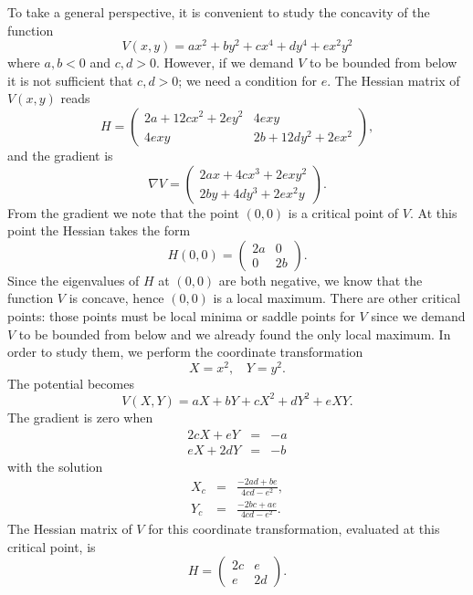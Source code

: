 To take a general perspective, it is convenient to study the concavity of the function
\begin{equation}
V(x,y) = ax^2 + by^2+cx^4+dy^4+ex^2y^2
\end{equation}
where $a,b<0$ and $c,d>0$. However, if we demand $V$ to be bounded from below it is not sufficient that $c,d>0$; we need a condition for $e$. The Hessian matrix of $V(x,y)$ reads
$$H=\begin{pmatrix}
2a+12cx^2+2ey^2 & 4exy \\
4exy & 2b+12dy^2+2ex^2 
\end{pmatrix},$$
and the gradient is
$$\nabla V = \begin{pmatrix}
2ax+4cx^3+2exy^2 \\
2by+4dy^3+2ex^2y
\end{pmatrix}.$$
From the gradient we note that the point $(0,0)$ is a critical point of $V$. At this point the Hessian takes the form
$$H(0,0)=\begin{pmatrix}
2a & 0 \\
0 & 2b
\end{pmatrix}.$$
Since the eigenvalues of $H$ at $(0,0)$ are both negative, we know that the function $V$ is concave, hence $(0,0)$ is a local maximum.
There are other critical points: those points must be local minima or saddle points for $V$ since we demand $V$ to be bounded from below and we already found the only local maximum. In order to study them, we perform the coordinate transformation
\begin{equation}
	X = x^2, \ \ \ \ Y =y^2.
	\label{eq:changeofcoor}
\end{equation}
The potential becomes
\begin{equation}
V(X,Y) = aX + bY+cX^2+dY^2+eXY.
\end{equation}
The gradient is zero when 
\begin{eqnarray}
2cX + eY & = & -a \\
eX + 2dY & = & -b
\end{eqnarray}
with the solution
\begin{eqnarray}
X_c & = & \frac{-2ad+be}{4cd-e^2}, \\
Y_c & = & \frac{-2bc+ae}{4cd-e^2}.
\end{eqnarray}
The Hessian matrix of $V$ for this coordinate transformation, evaluated at this critical point, is
\begin{equation}
H=\begin{pmatrix}
2c & e \\
e & 2d
\end{pmatrix}.
\end{equation}
